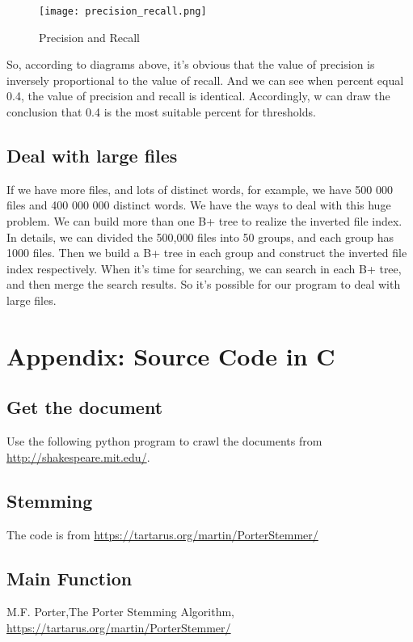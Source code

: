 \documentclass[12pt]{article}
\begin{document}
  \begin{figure}[H]
  	\centering
  	\texttt{[image: precision\_recall.png]}
  	\caption{Precision and Recall}
  \end{figure}
  So, according to diagrams above, it’s obvious that the value of precision is inversely proportional to the value of recall. And we can see when percent equal 0.4, the value of precision and recall is identical. Accordingly, w can draw the conclusion that 0.4 is the most suitable percent for thresholds.
\subsection{Deal with large files}
If we have more files, and lots of distinct words, for example, we have 500 000 files and 400 000 000 distinct words. We have the ways to deal with this huge problem. We can build more than one B+ tree to realize the inverted file index. In details, we can divided the 500,000 files into 50 groups, and each group has 1000 files. Then we build a B+ tree in each group and construct the inverted file index respectively. When it's time for searching, we can search in each B+ tree, and then merge the search results. So it's possible for our program to deal with large files.

\section{Appendix: Source Code in C}
\subsection{Get the document}
Use the following python program to crawl the documents from \url{http://shakespeare.mit.edu/}.
\lstset{language=python}
		{\ttfamily\textit{}}
\subsection{Stemming}
The code is from \url{https://tartarus.org/martin/PorterStemmer/}
\lstset{language=c}
		{\ttfamily\textit{}}
\subsection{Main Function}
		{\ttfamily\textit{}}
{}
\begin{thebibliography}{99}
	M.F. Porter,The Porter Stemming Algorithm, \url{https://tartarus.org/martin/PorterStemmer/}
	
\end{thebibliography}
\end{document}
